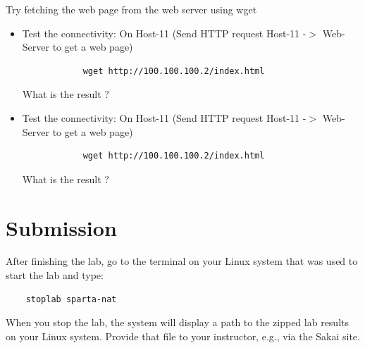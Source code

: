 Try fetching the web page from the web server using wget
\begin{itemize}
	\item Test the connectivity: On Host-11 (Send HTTP request Host-11 -$>$ Web-Server to get a web page)
	\begin{verbatim}
			wget http://100.100.100.2/index.html
	\end{verbatim}

	What is the result ?

	\item Test the connectivity: On Host-11 (Send HTTP request Host-11 -$>$ Web-Server to get a web page)
	\begin{verbatim}
			wget http://100.100.100.2/index.html
	\end{verbatim}

	What is the result ?
\end{itemize}

\section{Submission}
After finishing the lab, go to the terminal on your Linux system that was used to start the lab and type:
\begin{verbatim}
    stoplab sparta-nat
\end{verbatim}
When you stop the lab, the system will display a path to the zipped lab results on your Linux system.  Provide that file to
your instructor, e.g., via the Sakai site.


